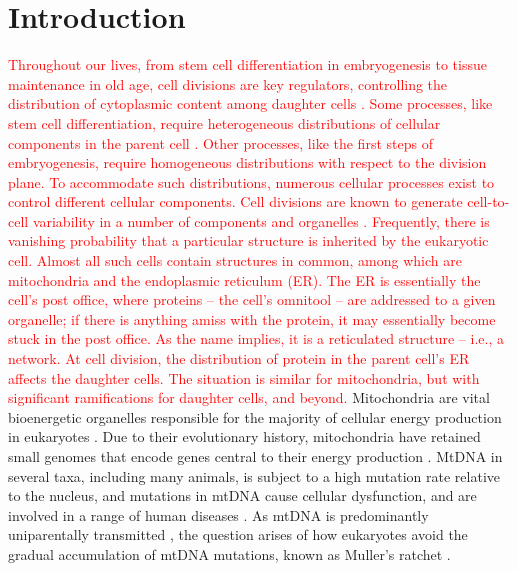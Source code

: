\documentclass{article}
\begin{document}
\section{Introduction}
\textcolor{red}{Throughout our lives, from stem cell differentiation in embryogenesis to tissue maintenance in old age, cell divisions are key regulators, controlling the distribution of cytoplasmic content among daughter cells \citep{huh2011non, huh2011random, das2010connecting, johnston2012mitochondrial, johnston2015closed}. Some processes, like stem cell differentiation, require heterogeneous distributions of cellular components in the parent cell \citep{kerr2019intracellular}. Other processes, like the first steps of embryogenesis, require homogeneous distributions with respect to the division plane. To accommodate such distributions, numerous cellular processes exist to control different cellular components. Cell divisions are known to generate cell-to-cell variability in a number of components and organelles \citep{johnston2012mitochondrial}. Frequently, there is vanishing probability that a particular structure is inherited by the eukaryotic cell. Almost all such cells contain structures in common, among which are mitochondria and the endoplasmic reticulum (ER). The ER is essentially the cell's post office, where proteins -- the cell's omnitool -- are addressed to a given organelle; if there is anything amiss with the protein, it may essentially become stuck in the post office. As the name implies, it is a reticulated structure -- i.e., a network. At cell division, the distribution of protein in the parent cell's ER affects the daughter cells. The situation is similar for mitochondria, but with significant ramifications for daughter cells, and beyond.}
Mitochondria are vital bioenergetic organelles responsible for the majority of cellular energy production in eukaryotes \citep{spinelli2018multifaceted, smith2015mitochondrial}. Due to their evolutionary history, mitochondria have retained small genomes \citep{martin1998gene, gray2001origin, roger2017origin} that encode genes central to their energy production \citep{johnston2016evolutionary, allen2017corr}. MtDNA in several taxa, including many animals, is subject to a high mutation rate relative to the nucleus, and mutations in mtDNA cause cellular dysfunction, and are involved in a range of human diseases \citep{wallace2013mitochondrial, burr2018mitochondrial}. As mtDNA is predominantly uniparentally transmitted \citep{greiner2015most}, the question arises of how eukaryotes avoid the gradual accumulation of mtDNA mutations, known as Muller's ratchet \citep{muller1964relation}. 
\end{document}
